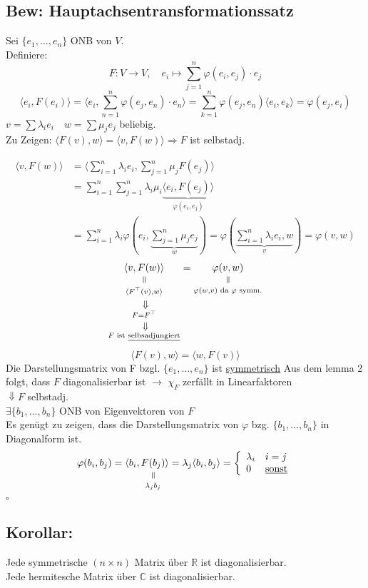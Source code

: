 \documentclass[titlepage,12pt,a4paper,ngerman]{report}
\newenvironment{bew}[1]{\subsection{Bew: #1}}{\hfill$\square$}
\newcommand{\Bew}[2]{\begin{bew}{#1}#2\end{bew}}
\newcommand{\verteq}{\rotatebox{90}{$\,=$}}
\newcommand{\equalto}[2]{\underset{\scriptstyle\overset{\mkern4mu\verteq}{#2}}{#1}}
\newcommand{\custo}[3]{\underset{\scriptstyle\overset{\mkern4mu\rotatebox{-90}{$\,#1$}}{#3}}{#2}}
\newcommand{\tx}[1]{\textrm{#1}}
\newcommand{\ub}[1]{\underbrace{#1}}
\newcommand{\basis}[3]{\{#1_{#2}, \dots, #1_{#3}\}}
\newcommand{\summ}[2]{\sum_{#1}^{#2}}
\newcommand{\casess}[4]{\left\{ \begin{array}{ll} {#1} & {#2} \\ {#3} & {#4} \end{array} \right.}
\newcommand{\ska}[2]{\langle #1 , #2 \rangle}
\begin{document}
\Bew{Hauptachsentransformationssatz}{
Sei $\basis{e}{1}{n}$ ONB von $V$.\\
Definiere: $$F:V \to V, \quad e_i \mapsto \summ{j = 1}{n} \varphi (e_i, e_j) \cdot e_j$$
$$\ska{e_i}{F(e_i)}= \ska{e_i}{\summ{n=1}{n} \varphi (e_j, e_n) \cdot e_n} = \summ{k=1}{n} \varphi ( e_j, e_n) \ska{e_i}{e_k} = \varphi (e_j,e_i)$$
$v = \sum \lambda_i e_i \quad w = \sum \mu_j e_j$ beliebig.\\
Zu Zeigen: $\ska{F(v)}{w}= \ska{v}{F(w)} \Rightarrow F$ ist selbstadj.

\begin{align*}
\ska{v}{F(w)} &= \ska{\sum_{i=1}^{n} \lambda_i e_i}{\sum_{j=1}^{n} \mu_j F(e_j)}\\
&= \sum_{i=1}^{n} \sum_{j=1}^{n} \lambda_i \mu_i \ub{\ska{e_i}{F(e_j)}}_{\varphi(e_i,e_j)}\\
&= \sum_{i=1}^{n} \lambda_i \varphi(e_i, \ub{\sum_{j=1}^{n} \mu_j e_j}_{w}) = \varphi(\ub{\sum_{i=1}^{n} \lambda_i e_i , w}_{v}) = \varphi(v,w)
\end{align*}
\begin{equation*}
\equalto{\ska{v}{F(w)}}{\custo{\Rightarrow}{\ska{F^\top(v)}{w}}{\custo{\Rightarrow}{F = F^\top}{F \tx{ ist \underline{selbsadjungiert}}}}} = \equalto{\varphi(v,w)}{\varphi(w,v) \tx{ da } \varphi \tx{ symm.}} 
\end{equation*}
\begin{equation*}
\ska{F(v)}{w} = \ska{w}{F(v)}
\end{equation*}
Die Darstellungsmatrix von F bzgl. $ \basis{e}{1}{n} $ ist \underline{symmetrisch}
Aus dem lemma 2 folgt, dass $F$ diagonalisierbar ist $\rightarrow$ $\chi_F$ zerfällt in Linearfaktoren\\ 
$\Downarrow F$ selbstadj.\\
$\exists \basis{b}{1}{n}$ ONB von Eigenvektoren von $F$\\
Es genügt zu zeigen, dass die Darstellungsmatrix von $\varphi$ bzg. $\basis{b}{1}{n}$ in Diagonalform ist.
$$\varphi(b_i, b_j) = \ska{b_i}{\equalto{F(b_j)}{\lambda_j b_j}} = \lambda_j\ska{b_i}{b_j} = \casess{\lambda_i}{i = j}{0}{\underline{\tx{sonst}}}$$
}

\subsection{Korollar:}
Jede symmetrische $ (n\times n) $ Matrix über $ \mathbb{R} $ ist diagonalisierbar.\\
Jede hermitesche Matrix über $ \mathbb{C} $ ist diagonalisierbar.
\end{document}
